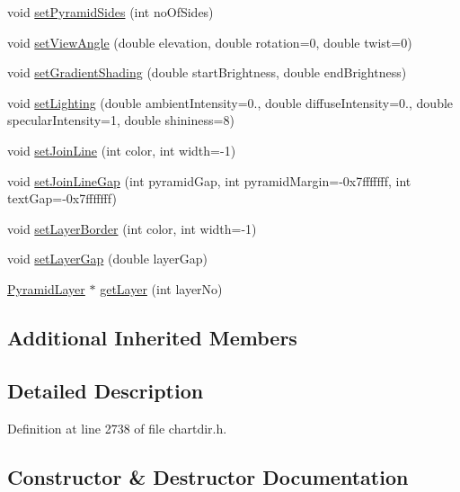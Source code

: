 \begin{DoxyCompactItemize}
\item 
void \hyperlink{class_pyramid_chart_af7e6a941c23f36996ee7e5aea4d3ba9b}{set\+Pyramid\+Sides} (int no\+Of\+Sides)
\item 
void \hyperlink{class_pyramid_chart_ac3dc9f4fac7f8ac89c6d2aa41af9542e}{set\+View\+Angle} (double elevation, double rotation=0, double twist=0)
\item 
void \hyperlink{class_pyramid_chart_ab18e5be206a8c7cc29bc1c79bdb5df2a}{set\+Gradient\+Shading} (double start\+Brightness, double end\+Brightness)
\item 
void \hyperlink{class_pyramid_chart_ad86b26cd02267eb566d402a0a1fafb80}{set\+Lighting} (double ambient\+Intensity=0., double diffuse\+Intensity=0., double specular\+Intensity=1, double shininess=8)
\item 
void \hyperlink{class_pyramid_chart_a61749b6cd05b439b66a00afe9ecca570}{set\+Join\+Line} (int color, int width=-\/1)
\item 
void \hyperlink{class_pyramid_chart_a62eee50bacc01aad83f2eee46817d2e4}{set\+Join\+Line\+Gap} (int pyramid\+Gap, int pyramid\+Margin=-\/0x7fffffff, int text\+Gap=-\/0x7fffffff)
\item 
void \hyperlink{class_pyramid_chart_a60f3d9e9230b779498d40c9b1a287fe5}{set\+Layer\+Border} (int color, int width=-\/1)
\item 
void \hyperlink{class_pyramid_chart_af3665fa72ba30465f59d2b8dc54eeaaf}{set\+Layer\+Gap} (double layer\+Gap)
\item 
\hyperlink{class_pyramid_layer}{Pyramid\+Layer} $\ast$ \hyperlink{class_pyramid_chart_abfcc75e4f7e3f2403701d1c824d85ffe}{get\+Layer} (int layer\+No)
\end{DoxyCompactItemize}
\subsection*{Additional Inherited Members}


\subsection{Detailed Description}


Definition at line 2738 of file chartdir.\+h.



\subsection{Constructor \& Destructor Documentation}
\mbox{\label{class_pyramid_chart_a67f11678a7a45f0293f06afd0bdacda5}} 
